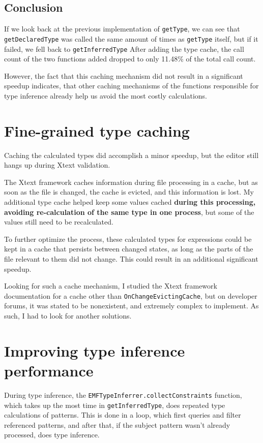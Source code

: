 \documentclass[11pt,a4paper,oneside]{report}
\begin{document}
\subsection{Conclusion}
If we look back at the previous implementation of \texttt{getType}, we can see
that \texttt{getDeclaredType} was called the same amount of times as
\texttt{getType} itself, but if it failed, we fell back to
\texttt{getInferredType} After adding the type cache, the call count of the two
functions added dropped to only 11.48\% of the total call count.

However, the fact that this caching mechanism did not result in a significant
speedup indicates, that other caching mechanisms of the functions responsible
for type inference already help us avoid the most costly calculations.

\section{Fine-grained type caching}\label{sec:FineGrained}
Caching the calculated types did accomplish a minor speedup, but the editor
still hangs up during Xtext validation.

The Xtext framework caches information during file processing in a cache, but as
soon as the file is changed, the cache is evicted, and this information is lost.
My additional type cache helped keep some values cached \textbf{during this
processing, avoiding re-calculation of the same type in one process}, but some
of the values still need to be recalculated.

To further optimize the process, these calculated types for expressions could
be kept in a cache that persists between changed states, as long as the parts of
the file relevant to them did not change. This could result in an additional
significant speedup.

Looking for such a cache mechanism, I studied the Xtext framework documentation
for a cache other than \texttt{OnChangeEvictingCache}, but on developer forums,
it was stated to be nonexistent, and extremely complex to
implement\cite{xtext-fine-grained-caching}. As such, I had to look for another
solutions.

\section{Improving type inference performance}
During type inference, the \texttt{EMFTypeInferrer.collectConstraints} function,
which takes up the most time in \texttt{getInferredType}, does repeated type
calculations of patterns. This is done in a loop, which first queries and filter
referenced patterns, and after that, if the subject pattern wasn't already
processed, does type inference.
\end{document}
